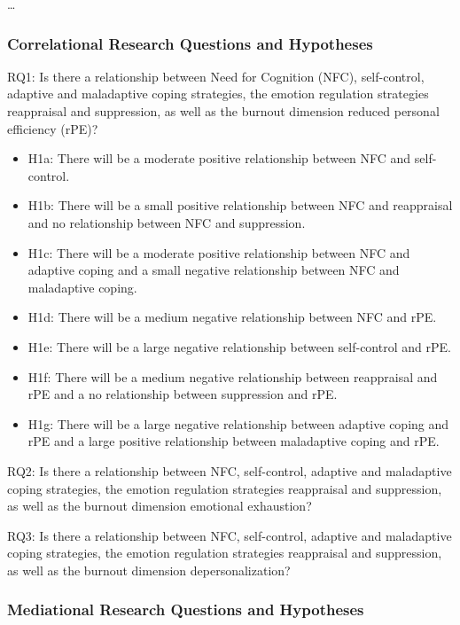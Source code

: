 \documentclass[
  english,
  man]{apa6}
\begin{document}
\ldots{}

\subsubsection{Correlational Research Questions and Hypotheses}\label{correlational-research-questions-and-hypotheses}

RQ1: Is there a relationship between Need for Cognition (NFC), self-control, adaptive and maladaptive coping strategies, the emotion regulation strategies reappraisal and suppression, as well as the burnout dimension reduced personal efficiency (rPE)?

\begin{itemize}
\item
  H1a: There will be a moderate positive relationship between NFC and self-control.
\item
  H1b: There will be a small positive relationship between NFC and reappraisal and no relationship between NFC and suppression.
\item
  H1c: There will be a moderate positive relationship between NFC and adaptive coping and a small negative relationship between NFC and maladaptive coping.
\item
  H1d: There will be a medium negative relationship between NFC and rPE.
\item
  H1e: There will be a large negative relationship between self-control and rPE.
\item
  H1f: There will be a medium negative relationship between reappraisal and rPE and a no relationship between suppression and rPE.
\item
  H1g: There will be a large negative relationship between adaptive coping and rPE and a large positive relationship between maladaptive coping and rPE.
\end{itemize}

RQ2: Is there a relationship between NFC, self-control, adaptive and maladaptive coping strategies, the emotion regulation strategies reappraisal and suppression, as well as the burnout dimension emotional exhaustion?

RQ3: Is there a relationship between NFC, self-control, adaptive and maladaptive coping strategies, the emotion regulation strategies reappraisal and suppression, as well as the burnout dimension depersonalization?

\subsubsection{Mediational Research Questions and Hypotheses}\label{mediational-research-questions-and-hypotheses}
\end{document}
